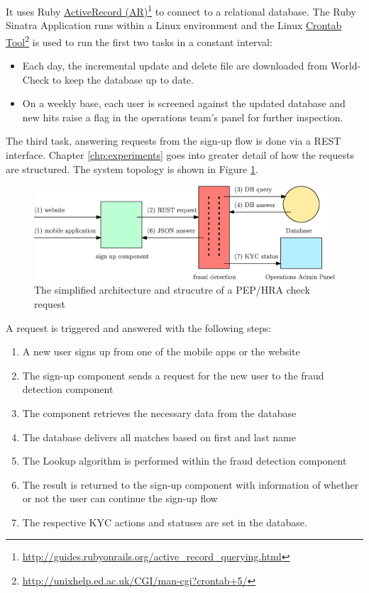 \documentclass[a4paper, oneside]{csthesis}
\newcommand\fnurl[2]{%
  \href{#2}{#1}\footnote{\url{#2}}%
}
\begin{document}
It uses Ruby \fnurl{ActiveRecord (AR)}{http://guides.rubyonrails.org/active_record_querying.html} to connect to a relational database. The Ruby Sinatra Application runs within a Linux environment and the Linux \fnurl{Crontab Tool}{http://unixhelp.ed.ac.uk/CGI/man-cgi?crontab+5/} is used to run the first two tasks in a constant interval:
\begin{itemize}
\item Each day, the incremental update and delete file are downloaded from World-Check to keep the database up to date.
\item On a weekly base, each user is screened against the updated database and new hits raise a flag in the operations team's panel for further inspection.
\end{itemize}

The third task, answering requests from the sign-up flow is done via a REST interface. Chapter \ref{chp:experiments} goes into greater detail of how the requests are structured. The system topology is shown in Figure \ref{fig:fraud-arch}.

\begin{figure}[tb]
    \begin{center}
        \includegraphics[width=\textwidth]{figures/fraud-arch2.eps}
    \end{center}
    \caption{The simplified architecture and strucutre of a PEP/HRA check request}
    \label{fig:fraud-arch}
\end{figure}

A request is triggered and answered with the following steps:

\begin{enumerate}
\item A new user signs up from one of the mobile apps or the website
\item The sign-up component sends a request for the new user to the fraud detection component
\item The component retrieves the necessary data from the database
\item The database delivers all matches based on first and last name
\item The Lookup algorithm is performed within the fraud detection component
\item The result is returned to the sign-up component with information of whether or not the user can continue the sign-up flow
\item The respective KYC actions and statuses are set in the database.
\end{enumerate}
\end{document}

